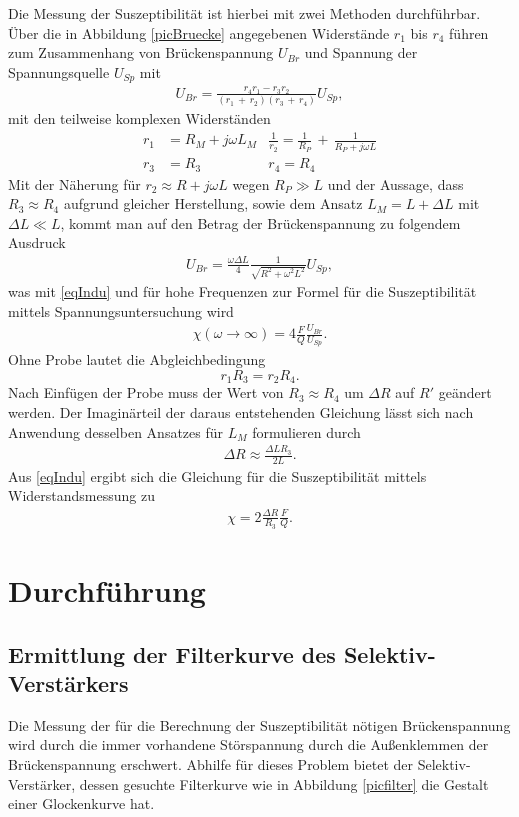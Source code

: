 Die Messung der Suszeptibilität ist hierbei mit zwei Methoden durchführbar. Über die in Abbildung \ref{picBruecke} angegebenen Widerstände
$r_1$ bis $r_4$ führen zum Zusammenhang von Brückenspannung $U_{Br}$ und Spannung der Spannungsquelle $U_{Sp}$ mit
\begin{align}
 U_{Br} = \frac{r_4 r_1 - r_3 r_2}{(r_1 \, + \, r_2)(r_3 \, + \, r_4)} U_{Sp},
\end{align}
mit den teilweise komplexen Widerständen
\begin{align*}
 r_1 &= R_M + j\omega L_M &\frac{1}{r_2} = \frac{1}{R_P}\,+\, \frac{1}{R_P + j \omega L}\\
 r_3 &= R_3	&r_4 = R_4
\end{align*}
Mit der Näherung für $r_2 \approx R  + j\omega L$ wegen $R_P \gg L$ und der Aussage, dass $R_3 \approx R_4$ aufgrund gleicher Herstellung,
sowie dem Ansatz $L_M = L + \Delta L$ mit $\Delta L \ll L$, kommt man auf den Betrag der Brückenspannung zu folgendem Ausdruck
\begin{align}
 U_{Br} = \frac{\omega \Delta L}{4} \frac{1}{\sqrt{R^2+\omega^2L^2}} U_{Sp},
\end{align}
was mit \eqref{eqIndu} und für hohe Frequenzen zur Formel für die Suszeptibilität mittels Spannungsuntersuchung wird
\begin{align}
 \chi(\omega \to \infty) = 4 \frac{F}{Q} \frac{U_{Br}}{U_{Sp}}.
\end{align}
Ohne Probe lautet die Abgleichbedingung 
\begin{equation}
 r_1 R_3 = r_2 R_4.
\end{equation}
Nach Einfügen der Probe muss der Wert von $R_3 \approx R_4$ um $\Delta R$ auf $R'$ geändert werden. Der Imaginärteil der daraus entstehenden
Gleichung lässt sich nach Anwendung desselben Ansatzes für $L_M$ formulieren durch
\begin{align}
 \Delta R \approx \frac{\Delta L R_3}{2L}.
\end{align}
Aus \eqref{eqIndu} ergibt sich die Gleichung für die Suszeptibilität mittels Widerstandsmessung zu
\begin{align}
 \chi = 2 \frac{\Delta R}{R_3} \frac{F}{Q}.
 \label{eq_chi_rechnung}
\end{align}

\section{Durchführung}
\subsection{Ermittlung der Filterkurve des Selektiv-Verstärkers}
Die Messung der für die Berechnung der Suszeptibilität nötigen Brückenspannung wird durch die immer vorhandene Störspannung durch
die Außenklemmen der Brückenspannung erschwert. Abhilfe für dieses Problem bietet der Selektiv-Verstärker, dessen gesuchte Filterkurve
wie in Abbildung \ref{picfilter} die Gestalt einer Glockenkurve hat. 

